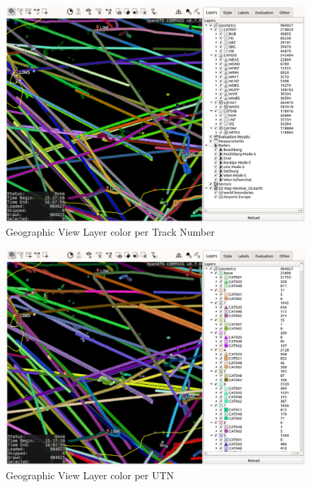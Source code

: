 \begin{figure}[H]
    \hspace*{-2.5cm}
    \includegraphics[width=19cm,frame]{figures/geoview_style_track_num.png}
  \caption{Geographic View Layer color per Track Number}
\end{figure}

\begin{figure}[H]
    \hspace*{-2.5cm}
    \includegraphics[width=19cm,frame]{figures/geoview_style_utn.png}
  \caption{Geographic View Layer color per UTN}
\end{figure}

